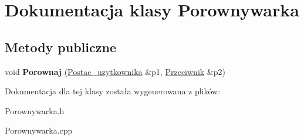 \hypertarget{class_porownywarka}{}\section{Dokumentacja klasy Porownywarka}
\label{class_porownywarka}
\subsection*{Metody publiczne}
\begin{DoxyCompactItemize}
\item 
void {\bfseries Porownaj} (\hyperlink{class_postac__uzytkownika}{Postac\+\_\+uzytkownika} \&p1, \hyperlink{class_przeciwnik}{Przeciwnik} \&p2)\hypertarget{class_porownywarka_aeb3991fd4e8c5b7f3ab1100dd9a0aac0}{}\label{class_porownywarka_aeb3991fd4e8c5b7f3ab1100dd9a0aac0}

\end{DoxyCompactItemize}


Dokumentacja dla tej klasy została wygenerowana z plików\+:\begin{DoxyCompactItemize}
\item 
Porownywarka.\+h\item 
Porownywarka.\+cpp\end{DoxyCompactItemize}
